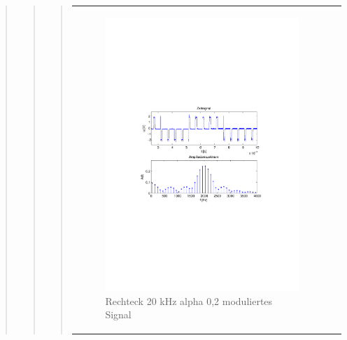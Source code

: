 \begin{quote}
\begin{quote}
\begin{quote}
\begin{center}
\begin{tabular}{ll}
            \hspace{-5cm}
                \begin{minipage}{0.6\textwidth}
                    \begin{figure}[H]
                        \includegraphics[scale=0.55, trim = 16mm 70mm 16mm 85mm, clip]{Bilder/flatrec20_02abget_zeit}
                          \caption{Rechteck 20 kHz alpha 0,2 moduliertes Signal}
		                  \label{fig:flatrec20_02zeit}
                    \end{figure}
                \end{minipage}
                

\end{tabular}
\end{center}
\end{quote}
\end{quote}
\end{quote}
